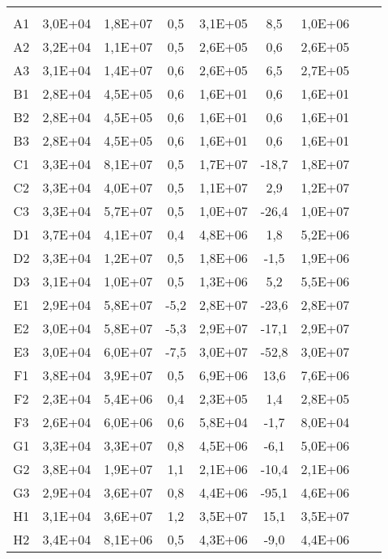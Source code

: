 \begin{center}
\begin{longtable}{ccccccccc}
\toprule
\endhead
\midrule \\ %
\endfoot
\bottomrule 
\endlastfoot
A1    & 3,0E+04 & 1,8E+07 & 0,5   & 3,1E+05 & 8,5   & 1,0E+06 \\
A2    & 3,2E+04 & 1,1E+07 & 0,5   & 2,6E+05 & 0,6   & 2,6E+05 \\
A3    & 3,1E+04 & 1,4E+07 & 0,6   & 2,6E+05 & 6,5   & 2,7E+05 \\
B1    & 2,8E+04 & 4,5E+05 & 0,6   & 1,6E+01 & 0,6   & 1,6E+01 \\
B2    & 2,8E+04 & 4,5E+05 & 0,6   & 1,6E+01 & 0,6   & 1,6E+01 \\
B3    & 2,8E+04 & 4,5E+05 & 0,6   & 1,6E+01 & 0,6   & 1,6E+01 \\
C1    & 3,3E+04 & 8,1E+07 & 0,5   & 1,7E+07 & -18,7 & 1,8E+07 \\
C2    & 3,3E+04 & 4,0E+07 & 0,5   & 1,1E+07 & 2,9   & 1,2E+07 \\
C3    & 3,3E+04 & 5,7E+07 & 0,5   & 1,0E+07 & -26,4 & 1,0E+07 \\
D1    & 3,7E+04 & 4,1E+07 & 0,4   & 4,8E+06 & 1,8   & 5,2E+06 \\
D2    & 3,3E+04 & 1,2E+07 & 0,5   & 1,8E+06 & -1,5  & 1,9E+06 \\
D3    & 3,1E+04 & 1,0E+07 & 0,5   & 1,3E+06 & 5,2   & 5,5E+06 \\
E1    & 2,9E+04 & 5,8E+07 & -5,2  & 2,8E+07 & -23,6 & 2,8E+07 \\
E2    & 3,0E+04 & 5,8E+07 & -5,3  & 2,9E+07 & -17,1 & 2,9E+07 \\
E3    & 3,0E+04 & 6,0E+07 & -7,5  & 3,0E+07 & -52,8 & 3,0E+07 \\
F1    & 3,8E+04 & 3,9E+07 & 0,5   & 6,9E+06 & 13,6  & 7,6E+06 \\
F2    & 2,3E+04 & 5,4E+06 & 0,4   & 2,3E+05 & 1,4   & 2,8E+05 \\
F3    & 2,6E+04 & 6,0E+06 & 0,6   & 5,8E+04 & -1,7  & 8,0E+04 \\
G1    & 3,3E+04 & 3,3E+07 & 0,8   & 4,5E+06 & -6,1  & 5,0E+06 \\
G2    & 3,8E+04 & 1,9E+07 & 1,1   & 2,1E+06 & -10,4 & 2,1E+06 \\
G3    & 2,9E+04 & 3,6E+07 & 0,8   & 4,4E+06 & -95,1 & 4,6E+06 \\
H1    & 3,1E+04 & 3,6E+07 & 1,2   & 3,5E+07 & 15,1  & 3,5E+07 \\
H2    & 3,4E+04 & 8,1E+06 & 0,5   & 4,3E+06 & -9,0  & 4,4E+06 \\

\end{longtable}
\end{center}
